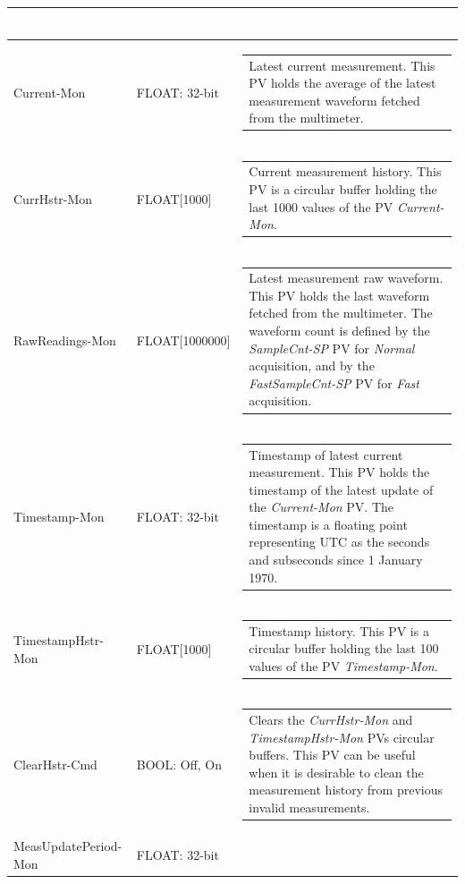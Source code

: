 \documentclass[openany]{article}
\begin{document}
\begin{longtable}{| m{3.0cm} m{4.5cm} m{7.0cm} |}
\begin{tabular}{@{}m{6cm}@{}}
						\end{tabular} \\ \hline
		Current-Mon & FLOAT: 32-bit & \begin{tabular}{@{}m{6cm}@{}}
	    					Latest current measurement. This PV holds the average of the latest measurement waveform fetched from the multimeter.
						\end{tabular} \\ \hline
		CurrHstr-Mon & FLOAT[1000] & \begin{tabular}{@{}m{6cm}@{}}
	    					Current measurement history. This PV is a circular buffer holding the last 1000 values of the PV \emph{Current-Mon}.
						\end{tabular} \\ \hline
		RawReadings-Mon & FLOAT[1000000] & \begin{tabular}{@{}m{6cm}@{}}
	    					Latest measurement raw waveform. This PV holds the last waveform fetched from the multimeter. The waveform count is defined by the \emph{SampleCnt-SP} PV for \emph{Normal} acquisition, and by the \emph{FastSampleCnt-SP} PV for \emph{Fast} acquisition.
						\end{tabular} \\ \hline
		Timestamp-Mon & FLOAT: 32-bit & \begin{tabular}{@{}m{6cm}@{}}
	    					Timestamp of latest current measurement. This PV holds the timestamp of the latest update of the \emph{Current-Mon} PV. The timestamp is a floating point representing UTC as the seconds and subseconds since 1 January 1970.
						\end{tabular} \\ \hline
		TimestampHstr-Mon & FLOAT[1000] & \begin{tabular}{@{}m{6cm}@{}}
	    					Timestamp history. This PV is a circular buffer holding the last 100 values of the PV \emph{Timestamp-Mon}.
						\end{tabular} \\ \hline
		ClearHstr-Cmd & BOOL: Off, On & \begin{tabular}{@{}m{6cm}@{}}
	    					Clears the \emph{CurrHstr-Mon} and \emph{TimestampHstr-Mon} PVs circular buffers. This PV can be useful when it is desirable to clean the measurement history from previous invalid measurements.
						\end{tabular} \\ \hline
		MeasUpdatePeriod-Mon & FLOAT: 32-bit & \begin{tabular}{@{}m{6cm}@{}}

\end{tabular}
\end{longtable}
\end{document}
